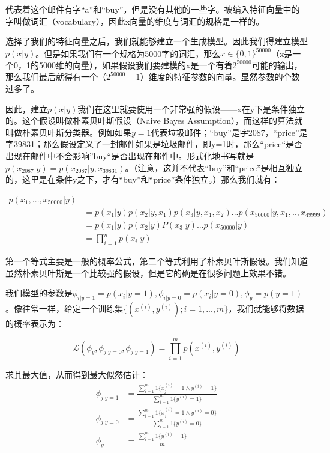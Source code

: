 \documentclass[UTF8]{ctexart}
\begin{document}
代表着这个邮件有字“a”和“buy”，但是没有其他的一些字。被编入特征向量中的字叫做词汇（vocabulary），因此x向量的维度与词汇的规格是一样的。

选择了我们的特征向量之后，我们就能够建立一个生成模型。因此我们得建立模型$p(x|y)$。但是如果我们有一个规格为5000字的词汇，那么$x\in \{ 0,1\} ^{50000}$（x是一个0，1的5000维的向量），如果假设我们要建模的x是一个有着$2^{50000}$可能的输出，那么我们最后就得有一个（$2^{50000}-1$）维度的特征参数的向量。显然参数的个数过多了。

因此，建立$p(x|y)$我们在这里就要使用一个非常强的假设——x在y下是条件独立的。这个假设叫做朴素贝叶斯假设（Naive Bayes Assumption），而这样的算法就叫做朴素贝叶斯分类器。例如如果$y=1$代表垃圾邮件；“buy”是字2087，“price”是字39831；那么假设定义了一封邮件如果是垃圾邮件，即y=1时，那么“price“是否出现在邮件中不会影响”buy“是否出现在邮件中。形式化地书写就是$p(x_{2087}|y)=p(x_{2087}|y,x_{39831})$。（注意，这并不代表“buy”和“price”是相互独立的，这里是在条件y之下，才有“buy”和“price”条件独立。）那么我们就有：

\begin{align*}
p(x_{1},...,x_{50000}|y) \\
& = p(x_{1}|y) p(x_{2}|y,x_{1}) p(x_{3}|y,x_{1},x_{2})...p(x_{50000}|y,x_{1},..,x_{49999}) \\
& = p(x_{1}|y) p(x_{2}|y)P(x_{3}|y) ... p(x_{50000}|y)\\
& = \prod_{i=1}^{n} p(x_{i}|y)
\end{align*}

第一个等式主要是一般的概率公式，第二个等式利用了朴素贝叶斯假设。我们知道虽然朴素贝叶斯是一个比较强的假设，但是它的确是在很多问题上效果不错。


我们模型的参数是$\phi_{i|y=1} = p(x_{i}|y=1),\phi_{i|y=0} = p(x_{i}|y=0),\phi_{y}=p(y=1)$。像往常一样，给定一个训练集$\{(x^{(i)},y^{(i)});i=1,...,m\}$，我们就能够将数据的概率表示为：

\[ \mathcal{L} (\phi_{y},\phi_{j|y=0},\phi_{j|y=1}) =\prod_{i=1}^{m} p(x^{(i)},y^{(i)})  \]

求其最大值，从而得到最大似然估计：
\begin{align*}
\phi_{j|y=1} & = \frac{\sum_{i=1}^{m}1\{x_{j}^{(i)}=1 \land y^{(i)}=1 \}}{ \sum_{i=1}^{m} 1 \{ y^{(i)}=1\}} \\
\phi_{j|y=0} & = \frac{\sum_{i=1}^{m}1\{x_{j}^{(i)}=1 \land y^{(i)}=0 \}}{ \sum_{i=1}^{m} 1 \{ y^{(i)}=0\}} \\
\phi_{y} & = \frac{\sum_{i=1}^{m} 1 \{ y^{(i)}=1\}}{m}
\end{align*}
\end{document}
